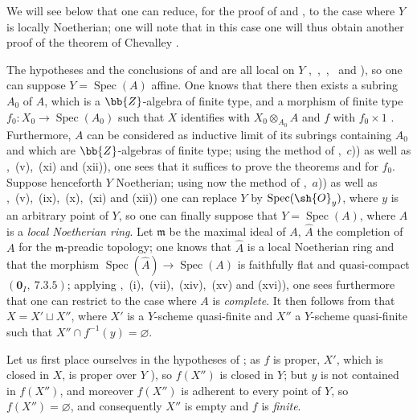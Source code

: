 \begin{remark}[8.11.3]
\label{IV.8.11.3}
We will see below that one can reduce, for the proof of  and , to the case where $Y$ is locally Noetherian; one will note that in this case one will thus obtain another proof of the theorem of Chevalley .
\end{remark}


\begin{env}[8.11.4]
\label{IV.8.11.4}
The hypotheses and the conclusions of  and  are all local on $Y$ ,~,~,~ and ), so one can suppose $Y=\operatorname{Spec}(A)$ affine.
One knows that there then exists a subring $A_0$ of $A$, which is a $\bb{Z}$-algebra of finite type, and a morphism of finite type $f_0:X_0\to\operatorname{Spec}(A_0)$ such that $X$ identifies with $X_0\otimes_{A_0}A$ and $f$ with $f_0\times 1$ .
Furthermore, $A$ can be considered as inductive limit of its subrings containing $A_0$ and which are $\bb{Z}$-algebras of finite type; using the method of ,~$c$)) as well as ,~(v),~(xi) and (xii)), one sees that it suffices to prove the theorems  and  for $f_0$.
Suppose henceforth $Y$ Noetherian; using now the method of ,~$a$)) as well as ,~(v),~(ix),~(x),~(xi) and (xii)) one can replace $Y$ by $\operatorname{Spec}(\sh{O}_y)$, where $y$ is an
arbitrary point of $Y$, so one can finally suppose that $Y=\operatorname{Spec}(A)$, where $A$ is a \emph{local Noetherian ring}.
Let $\mathfrak{m}$ be the maximal ideal of $A$, $\hat{A}$ the completion of $A$ for the $\mathfrak{m}$-preadic topology; one knows that $\hat{A}$ is a local Noetherian ring and that the morphism $\operatorname{Spec}(\hat{A})\to\operatorname{Spec}(A)$ is faithfully flat and quasi-compact $(\mathbf{0}_I,~7.3.5)$; applying ,~(i),~(vii),~(xiv),~(xv) and (xvi)), one sees furthermore that one can restrict to the case where $A$ is \emph{complete}.
It then follows from  that $X=X'\sqcup X''$, where $X'$ is a $Y$-scheme quasi-finite and $X''$ a $Y$-scheme quasi-finite such that $X''\cap f^{-1}(y)=\varnothing$.
\end{env}

Let us first place ourselves in the hypotheses of ; as $f$ is proper, $X'$, which is closed in $X$, is proper over $Y$ ), so $f(X'')$ is closed in $Y$; but $y$ is not contained in $f(X'')$, and moreover $f(X'')$ is adherent to every point of $Y$, so $f(X'')=\varnothing$, and consequently $X''$ is empty and $f$ is \emph{finite}.

